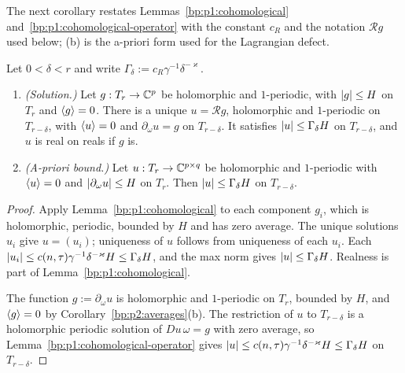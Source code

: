 The next corollary restates Lemmas~\ref{bp:p1:cohomological} and~\ref{bp:p1:cohomological-operator}
with the constant $c_R$ and the notation $\mathcal R g$ used below; (b) is the a-priori form used for the
Lagrangian defect.

\begin{corollary}\label{bp:p2:cohomological}
Let $0<\delta<r$ and write $\Gamma_\delta:=c_R\gamma^{-1}\delta^{-\varkappa}$.
\begin{enumerate}[label=(\alph*)]
\item\emph{(Solution.)} Let $g:T_r\to\mathbb{C}^p$ be holomorphic and $1$-periodic, with $\lvert g\rvert\le H$ on $T_r$
  and $\langle g\rangle=0$. There is a unique $u=\mathcal R g$, holomorphic and $1$-periodic on $T_{r-\delta}$, with
  $\langle u\rangle=0$ and $\partial_\omega u=g$ on $T_{r-\delta}$. It satisfies $\lvert u\rvert\le\Gamma_\delta H$ on
  $T_{r-\delta}$, and $u$ is real on reals if $g$ is.
\item\emph{(A-priori bound.)} Let $u:T_r\to\mathbb{C}^{p\times q}$ be holomorphic and $1$-periodic with
  $\langle u\rangle=0$ and $\lvert \partial_\omega u\rvert\le H$ on $T_r$. Then $\lvert u\rvert\le\Gamma_\delta H$ on
  $T_{r-\delta}$.
\end{enumerate}
\end{corollary}

\begin{proof}
\label{step:p2:coh-components}
Apply Lemma~\ref{bp:p1:cohomological} to each component $g_i$, which is holomorphic, periodic, bounded
by $H$ and has zero average. The unique solutions $u_i$ give $u=(u_i)$; uniqueness of $u$ follows from
uniqueness of each $u_i$. Each $\lvert u_i\rvert\le c(n,\tau)\gamma^{-1}\delta^{-\varkappa}H\le\Gamma_\delta H$,
and the max norm gives $\lvert u\rvert\le\Gamma_\delta H$. Realness is part of Lemma~\ref{bp:p1:cohomological}.

\label{step:p2:coh-apriori}
The function $g:=\partial_\omega u$ is holomorphic and $1$-periodic on $T_r$, bounded by $H$, and
$\langle g\rangle=0$ by Corollary~\ref{bp:p2:averages}(b). The restriction of $u$ to $T_{r-\delta}$ is a holomorphic
periodic solution of $Du\,\omega=g$ with zero average, so Lemma~\ref{bp:p1:cohomological-operator} gives
$\lvert u\rvert\le c(n,\tau)\gamma^{-1}\delta^{-\varkappa}H\le\Gamma_\delta H$ on $T_{r-\delta}$.
\end{proof}

